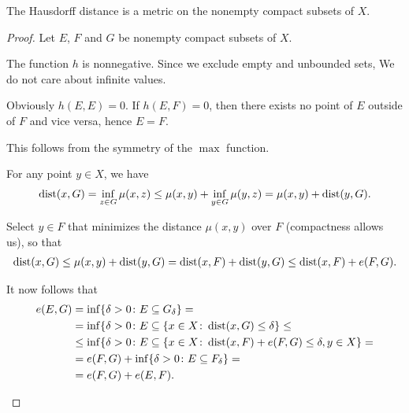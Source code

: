\begin{proposition}\label{thm:hausdorff_distance_is_metric}
  The Hausdorff distance is a metric on the nonempty compact subsets of \( X \).
\end{proposition}
\begin{proof}
  Let \( E \), \( F \) and \( G \) be nonempty compact subsets of \( X \).

  The function \( h \) is nonnegative. Since we exclude empty and unbounded sets, We do not care about infinite values.

  \begin{description}
     Obviously \( h(E, E) = 0 \). If \( h(E, F) = 0 \), then there exists no point of \( E \) outside of \( F \) and vice versa, hence \( E = F \).

     This follows from the symmetry of the \( \max \) function.

     For any point \( y \in X \), we have
    \begin{align*}
      \operatorname{dist}(x, G)
      =
      \inf_{z \in G} \mu(x, z)
      \leq
      \mu(x, y) + \inf_{y \in G} \mu(y, z)
      =
      \mu(x, y) + \operatorname{dist}(y, G).
    \end{align*}

    Select \( y \in F \) that minimizes the distance \( \mu(x, y) \) over \( F \) (compactness allows us), so that %
    \begin{align*}
      \operatorname{dist}(x, G)
      \leq
      \mu(x, y) + \operatorname{dist}(y, G)
      =
      \operatorname{dist}(x, F) + \operatorname{dist}(y, G)
      \leq
      \operatorname{dist}(x, F) + e(F, G).
    \end{align*}

    It now follows that
    \begin{align*}
      e(E, G)
      &=
      \inf \{\delta > 0 \colon E \subseteq G_\delta \}
      = \\ &=
      \inf \{\delta > 0 \colon E \subseteq \{ x \in X \colon \operatorname{dist}(x, G) \leq \delta \}
      \leq \\ &\leq
      \inf \{\delta > 0 \colon E \subseteq \{ x \in X \colon \operatorname{dist}(x, F) + e(F, G) \leq \delta, y \in X \}
      = \\ &=
      e(F, G) + \inf \{\delta > 0 \colon E \subseteq F_\delta \}
      = \\ &=
      e(F, G) + e(E, F).
    \end{align*}
  \end{description}
\end{proof}
